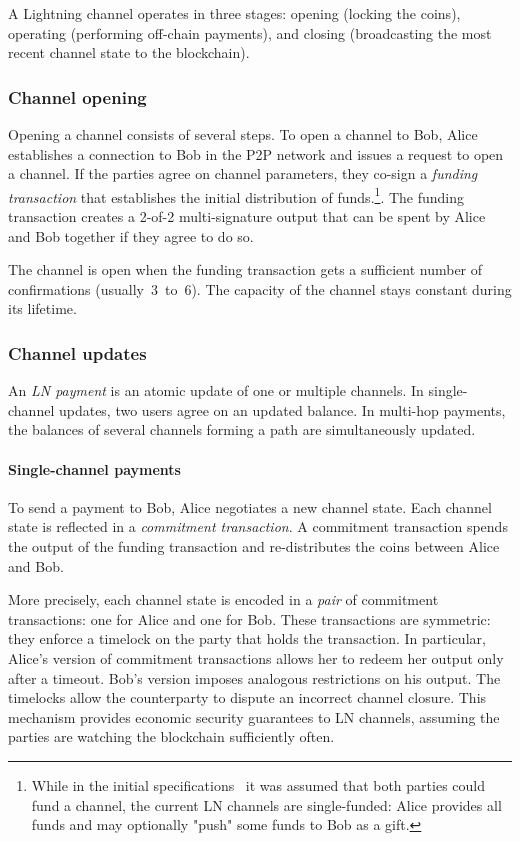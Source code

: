 A Lightning channel operates in three stages: opening (locking the coins), operating (performing off-chain payments), and closing (broadcasting the most recent channel state to the blockchain).


\subsubsection*{Channel opening}

Opening a channel consists of several steps.
To open a channel to Bob, Alice establishes a connection to Bob in the P2P network and issues a request to open a channel.
If the parties agree on channel parameters, they co-sign a \textit{funding transaction} that establishes the initial distribution of funds.\footnote{While in the initial specifications~\cite{Poon2016} it was assumed that both parties could fund a channel, the current LN channels are single-funded: Alice provides all funds and may optionally "push" some funds to Bob as a gift.}.
The funding transaction creates a 2-of-2 multi-signature output that can be spent by Alice and Bob together if they agree to do so.

The channel is open when the funding transaction gets a sufficient number of confirmations (usually~$3$~to~$6$).
The capacity of the channel stays constant during its lifetime.

\subsubsection*{Channel updates}

An \textit{LN payment} is an atomic update of one or multiple channels.
In single-channel updates, two users agree on an updated balance.
In multi-hop payments, the balances of several channels forming a path are simultaneously updated.

\paragraph{Single-channel payments}

To send a payment to Bob, Alice negotiates a new channel state.
Each channel state is reflected in a \textit{commitment transaction}.
A commitment transaction spends the output of the funding transaction and re-distributes the coins between Alice and Bob.

More precisely, each channel state is encoded in a \textit{pair} of commitment transactions: one for Alice and one for Bob.
These transactions are symmetric: they enforce a timelock on the party that holds the transaction.
In particular, Alice's version of commitment transactions allows her to redeem her output only after a timeout.
Bob's version imposes analogous restrictions on his output.
The timelocks allow the counterparty to dispute an incorrect channel closure.
This mechanism provides economic security guarantees to LN channels, assuming the parties are watching the blockchain sufficiently often.

